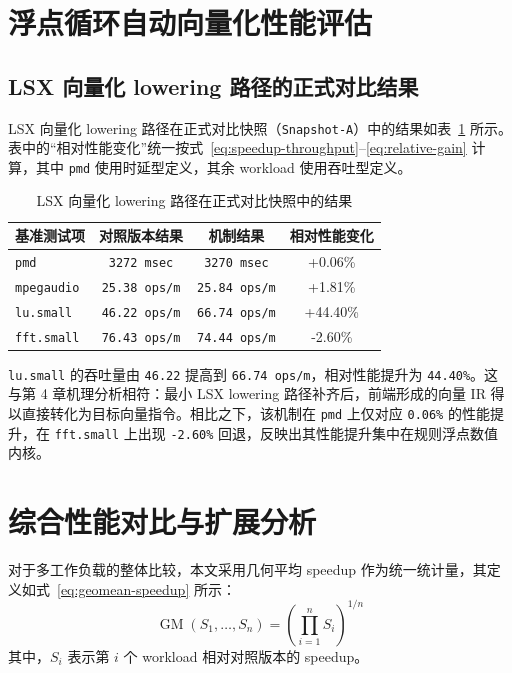 \section{浮点循环自动向量化性能评估}

\subsection{LSX 向量化 lowering 路径的正式对比结果}

LSX 向量化 lowering 路径在正式对比快照（\texttt{Snapshot-A}）中的结果如表~\ref{tab:scheme3-result} 所示。表中的“相对性能变化”统一按式~\ref{eq:speedup-throughput}--\ref{eq:relative-gain} 计算，其中 \texttt{pmd} 使用时延型定义，其余 workload 使用吞吐型定义。

\begin{table}[htbp]
    \centering
    \small
    \caption{LSX 向量化 lowering 路径在正式对比快照中的结果}
    \label{tab:scheme3-result}
    \begin{tabular}{lccc}
        \toprule
        \textbf{基准测试项} & \textbf{对照版本结果} & \textbf{机制结果} & \textbf{相对性能变化} \\
        \midrule
        \texttt{pmd} & \texttt{3272\,msec} & \texttt{3270\,msec} & +0.06\% \\
        \texttt{mpegaudio} & \texttt{25.38\,ops/m} & \texttt{25.84\,ops/m} & +1.81\% \\
        \texttt{lu.small} & \texttt{46.22\,ops/m} & \texttt{66.74\,ops/m} & +44.40\% \\
        \texttt{fft.small} & \texttt{76.43\,ops/m} & \texttt{74.44\,ops/m} & -2.60\% \\
        \bottomrule
    \end{tabular}
\end{table}

\texttt{lu.small} 的吞吐量由 \texttt{46.22} 提高到 \texttt{66.74\,ops/m}，相对性能提升为 \texttt{44.40\%}。这与第 4 章机理分析相符：最小 LSX lowering 路径补齐后，前端形成的向量 IR 得以直接转化为目标向量指令。相比之下，该机制在 \texttt{pmd} 上仅对应 \texttt{0.06\%} 的性能提升，在 \texttt{fft.small} 上出现 \texttt{-2.60\%} 回退，反映出其性能提升集中在规则浮点数值内核。

\section{综合性能对比与扩展分析}

对于多工作负载的整体比较，本文采用几何平均 speedup 作为统一统计量，其定义如式~\ref{eq:geomean-speedup} 所示：
\begin{equation}
    \label{eq:geomean-speedup}
    \operatorname{GM}(S_1,\ldots,S_n)=\left(\prod_{i=1}^{n} S_i\right)^{1/n}
\end{equation}
其中，$S_i$ 表示第 $i$ 个 workload 相对对照版本的 speedup。

